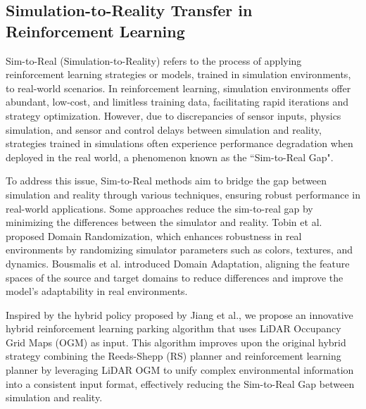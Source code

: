\subsection{Simulation-to-Reality Transfer in Reinforcement Learning}

Sim-to-Real (Simulation-to-Reality) refers to the process of applying reinforcement learning strategies or models, trained in simulation environments, to real-world scenarios\cite{zhao2020sim}. 
In reinforcement learning, simulation environments offer abundant, low-cost, and limitless training data, facilitating rapid iterations and strategy optimization. 
However, due to discrepancies of sensor inputs, physics simulation, and sensor and control delays\cite{robotics_sim2real_yu2024} between simulation and reality, strategies trained in simulations often experience performance degradation when deployed in the real world, a phenomenon known as the “Sim-to-Real Gap".

To address this issue, Sim-to-Real methods aim to bridge the gap between simulation and reality through various techniques, ensuring robust performance in real-world applications. 
Some approaches reduce the sim-to-real gap by minimizing the differences between the simulator and reality. 
Tobin et al.\cite{tobin2017domain} proposed Domain Randomization, which enhances robustness in real environments by randomizing simulator parameters such as colors, textures, and dynamics. 
Bousmalis et al.\cite{bousmalis2018using} introduced Domain Adaptation, aligning the feature spaces of the source and target domains to reduce differences and improve the model's adaptability in real environments.


Inspired by the hybrid policy proposed by Jiang et al.\cite{jiang2024hope}, we propose an innovative hybrid reinforcement learning parking algorithm that uses LiDAR Occupancy Grid Maps (OGM) as input. This algorithm improves upon the original hybrid strategy combining the Reeds-Shepp (RS) planner and reinforcement learning planner by leveraging LiDAR OGM to unify complex environmental information into a consistent input format, effectively reducing the Sim-to-Real Gap between simulation and reality.



